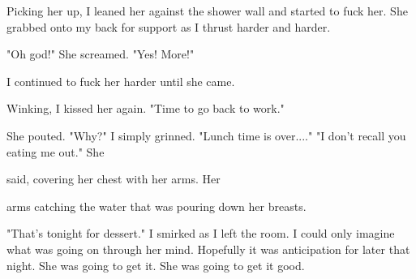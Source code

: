 Picking her up, I leaned her against the shower wall and started to fuck her. She grabbed onto my back for support as I thrust harder and harder.

"Oh god!" She screamed. "Yes! More!"

I continued to fuck her harder until she came.

Winking, I kissed her again. "Time to go back to work."

She pouted. "Why?"
I simply grinned. "Lunch time is over...." "I don't recall you eating me out." She

said, covering her chest with her arms. Her

arms catching the water that was pouring down her breasts.

"That's tonight for dessert." I smirked as I left the room. I could only imagine what was going on through her mind. Hopefully it was anticipation for later that night. She was going to get it. She was going to get it good.

